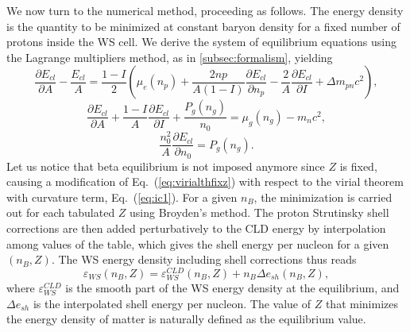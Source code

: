 We now turn to the numerical method, proceeding as follows. The energy density
is the quantity to be minimized at constant baryon density for a fixed number 
of protons inside the WS cell. We derive the system of equilibrium 
equations using the Lagrange multipliers method, as in \ref{subsec:formalism}, 
yielding
%
\begin{equation}
  \frac{\partial E_{cl}}{\partial A} - \frac{E_{cl}}{A} = \frac{1-I}{2}
  \left(\mu_e(n_p) +
  \frac{2np}{A(1-I)}\frac{\partial E_{cl}}{\partial n_p} 
  - \frac{2}{A}\frac{\partial E_{cl}}{\partial I} + \Delta
m_{pn}c^2\right),\label{eq:virialthfixz}
\end{equation}
\begin{equation}
  \frac{\partial E_{cl}}{\partial A} + \frac{1-I}{A}\frac{\partial
  E_{cl}}{\partial I} + \frac{P_g(n_g)}{n_0} = \mu_g(n_g) - m_nc^2,
\end{equation}
\begin{equation}
  \frac{n_0^2}{A}\frac{\partial E_{cl}}{\partial n_0} = P_g(n_g).
\end{equation}
%
Let us notice that beta equilibrium is not imposed anymore since $Z$ is fixed, 
causing a modification of Eq.~(\ref{eq:virialthfixz}) with respect to the virial 
theorem with curvature term, Eq.~(\ref{eq:ic1}). For a given $n_B$, the 
minimization is carried out for each tabulated $Z$ using Broyden's 
method. The proton Strutinsky shell corrections are then added perturbatively 
to the CLD energy by interpolation among values of the table, which gives the
shell energy per nucleon for a given $(n_B,Z)$. The WS energy density including
shell corrections thus reads
%
\begin{equation}
  \varepsilon_{WS}(n_B,Z) = \varepsilon_{WS}^{CLD}(n_B,Z) + n_B\Delta
  e_{sh}(n_B,Z),
\end{equation}
%
where $\varepsilon_{WS}^{CLD}$ is the smooth part of the WS energy density at the
equilibrium, and $\Delta e_{sh}$ is the interpolated shell energy per nucleon.
The value of $Z$ that minimizes the energy density of matter is naturally 
defined as the equilibrium value.

